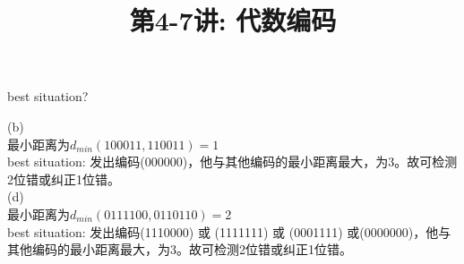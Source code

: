 \documentclass[a4paper, justified]{tufte-handout}
\title{第4-7讲: 代数编码}
\date{\zhtoday} %
\begin{document}
\maketitle
\noplagiarism %
\begin{abstract}
\end{abstract}
\beginrequired

\begin{problem}[TJ 8-6(b,d)]
best situation?
\end{problem}

\begin{solution}
(b)\\
最小距离为$d_{min}(100011, 110011)=1$\\
best situation: 发出编码(000000)，他与其他编码的最小距离最大，为3。故可检测2位错或纠正1位错。\\
(d)\\
最小距离为$d_{min}(0111100, 0110110)=2$\\
best situation: 发出编码(1110000) 或 (1111111) 或 (0001111) 或(0000000)，他与其他编码的最小距离最大，为3。故可检测2位错或纠正1位错。\\
\end{solution}

\begin{problem}[TJ 8-7(c,d)]
\end{problem}
\end{document}
